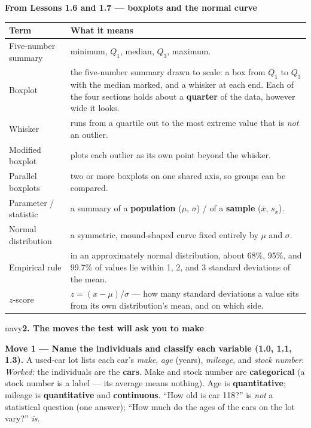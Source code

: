 \documentclass[12pt]{article}
\newcommand{\sghead}[2][10]{%
  \vspace{0.13in}
  \boxguard[#1]
  \begin{headlinebox}{navy}\color{white}\bfseries\small #2\end{headlinebox}
  \vspace{0.09in}}
\newcommand{\vocabhead}[1]{%
  \textbf{#1}\par\vspace{3pt}}
\begin{document}
\vspace{7pt}
\boxguard[9]
\vocabhead{From Lessons 1.6 and 1.7 --- boxplots and the normal curve}
\noindent\begin{tabularx}{\linewidth}{@{} l X @{}}
\rowcolor{sky}
\textbf{Term} & \textbf{What it means} \\
\midrule
Five-number summary & minimum, $Q_1$, median, $Q_3$, maximum. \\
Boxplot & the five-number summary drawn to scale: a box from $Q_1$ to $Q_3$ with the median
          marked, and a whisker at each end. Each of the four sections holds about a
          \textbf{quarter} of the data, however wide it looks. \\
Whisker & runs from a quartile out to the most extreme value that is \emph{not} an outlier. \\
Modified boxplot & plots each outlier as its own point beyond the whisker. \\
Parallel boxplots & two or more boxplots on one shared axis, so groups can be compared. \\
Parameter / statistic & a summary of a \textbf{population} ($\mu$, $\sigma$) / of a
                        \textbf{sample} ($\bar x$, $s_x$). \\
Normal distribution & a symmetric, mound-shaped curve fixed entirely by $\mu$ and $\sigma$. \\
Empirical rule & in an approximately normal distribution, about 68\%, 95\%, and 99.7\% of values
                 lie within 1, 2, and 3 standard deviations of the mean. \\
$z$-score & $z = (x - \mu)/\sigma$ --- how many standard deviations a value sits from its own
            distribution's mean, and on which side. \\
\end{tabularx}

\normalsize

\sghead{2. The moves the test will ask you to make}

\small
\textbf{Move 1 --- Name the individuals and classify each variable (1.0, 1.1, 1.3).} A used-car
lot lists each car's \emph{make}, \emph{age} (years), \emph{mileage}, and \emph{stock number}.
\emph{Worked:} the individuals are the \textbf{cars}. Make and stock number are
\textbf{categorical} (a stock number is a label --- its average means nothing). Age is
\textbf{quantitative}; mileage is \textbf{quantitative} and \textbf{continuous}. ``How old is
car 118?'' is \emph{not} a statistical question (one answer); ``How much do the ages of the cars
on the lot vary?'' \emph{is}.
\end{document}
